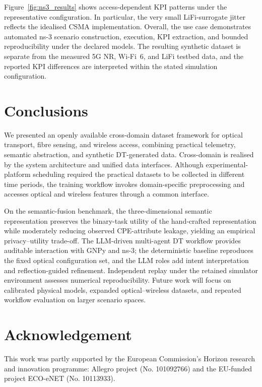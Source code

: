 \documentclass[9pt,twocolumn,twoside]{osajnl}
\begin{document}
Figure~\ref{fig:ns3_results} shows access-dependent KPI patterns under the representative configuration. In particular, the very small LiFi-surrogate jitter reflects the idealised CSMA implementation. Overall, the use case demonstrates automated ns-3 scenario construction, execution, KPI extraction, and bounded reproducibility under the declared models. The resulting synthetic dataset is separate from the measured 5G NR, Wi-Fi~6, and LiFi testbed data, and the reported KPI differences are interpreted within the stated simulation configuration.

\section{Conclusions}
We presented an openly available cross-domain dataset framework for optical transport, fibre sensing, and wireless access, combining practical telemetry, semantic abstraction, and synthetic DT-generated data. Cross-domain is realised by the system architecture and unified data interfaces. Although experimental-platform scheduling required the practical datasets to be collected in different time periods, the training workflow invokes domain-specific preprocessing and accesses optical and wireless features through a common interface.

On the semantic-fusion benchmark, the three-dimensional semantic representation preserves the binary-task utility of the hand-crafted representation while moderately reducing observed CPE-attribute leakage, yielding an empirical privacy--utility trade-off. The LLM-driven multi-agent DT workflow provides auditable interaction with GNPy and ns-3; the deterministic baseline reproduces the fixed optical configuration set, and the LLM roles add intent interpretation and reflection-guided refinement. Independent replay under the retained simulator environment assesses numerical reproducibility. Future work will focus on calibrated physical models, expanded optical--wireless datasets, and repeated workflow evaluation on larger scenario spaces.

\section*{Acknowledgement}
This work was partly supported by the European Commission's Horizon research and innovation programme: Allegro project (No. 101092766) and the EU-funded project ECO-eNET (No. 10113933).


\end{document}
